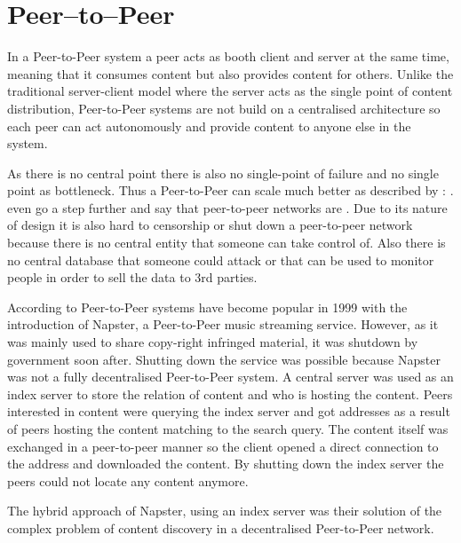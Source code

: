 \section{Peer–to–Peer}\label{sec:peer-to-peer}

In a Peer-to-Peer system a peer acts as booth client and server at the same time, meaning that it consumes content but also provides content for others. Unlike the traditional server-client model where the server acts as the single point of content distribution, Peer-to-Peer systems are not build on a centralised architecture so each peer can act autonomously and provide content to anyone else in the system.

As there is no central point there is also no single-point of failure and no single point as bottleneck. Thus a Peer-to-Peer can scale much better as described by \citet[\S1]{newscast-gossiping}:
. \citet[\S7.5.4]{tanenbaum_wetherall_2011} even go a step further and say that peer-to-peer networks are .
Due to its nature of design it is also hard to censorship or shut down a peer-to-peer network because there is no central entity that someone can take control of. Also there is no central database that someone could attack or that can be used to monitor people in order to sell the data to 3rd parties.

According to \citet{tanenbaum_wetherall_2011} Peer-to-Peer systems have become popular in 1999 with the introduction of Napster, a Peer-to-Peer music streaming service. However, as it was mainly used to share copy-right infringed material, it was shutdown by government soon after. Shutting down the service was possible because Napster was not a fully decentralised Peer-to-Peer system. A central server was used as an index server to store the relation of content and who is hosting the content. Peers interested in content were querying the index server and got addresses as a result of peers hosting the content matching to the search query. The content itself was exchanged in a peer-to-peer manner so the client opened a direct connection to the address and downloaded the content. By shutting down the index server the peers could not locate any content anymore. 

The hybrid approach of Napster, using an index server was their solution of the complex problem of content discovery in a decentralised Peer-to-Peer network.

